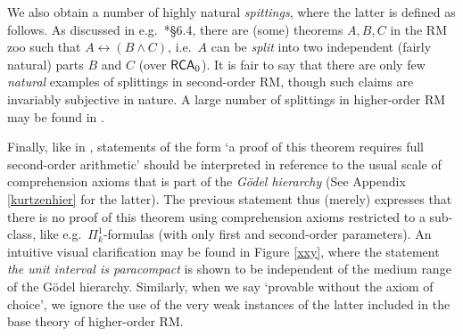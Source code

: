 \documentclass[reqno]{amsart}
\def\Z{\textup{\textsf{Z}}}
\def\RCA{\textup{\textsf{RCA}}}
\def\WKL{\textup{\textsf{WKL}}}
\def\WWKL{\textup{\textsf{WWKL}}}
\def\asa{\leftrightarrow}
\numberwithin{equation}{section}
\numberwithin{thm}{section}
\begin{document}
\smallskip

We also obtain a number of highly natural \emph{spittings}, where the latter is defined as follows.  
As discussed in e.g.\ \cite{dsliceke}*{\S6.4}, there are (some) theorems $A, B, C$ in the RM zoo such that $A\asa (B\wedge C)$, i.e.\ $A$ can be \emph{split} into two independent (fairly natural) parts $B$ and $C$ (over $\RCA_{0}$).  
It is fair to say that there are only few \emph{natural} examples of splittings in second-order RM, though such claims are invariably subjective in nature. 
A large number of splittings in higher-order RM may be found in \cite{samsplit}.  
%
%
%

\smallskip

Finally, like in \cite{dagsamIII, dagsamV}, statements of the form `a proof of this theorem requires full second-order arithmetic' should be interpreted in reference to the usual scale of comprehension axioms that is part of the \emph{G\"odel hierarchy} (See Appendix \ref{kurtzenhier} for the latter).  
The previous statement thus (merely) expresses that there is no proof of this theorem using comprehension axioms restricted to a sub-class, like e.g.\ $\Pi_{k}^{1}$-formulas (with only first and second-order parameters).  An intuitive visual clarification may be found in 
Figure \ref{xxy}, where the statement \emph{the unit interval is paracompact} is shown to be independent of the medium range of the G\"odel hierarchy.  Similarly, when we say `provable without the axiom of choice', we ignore the use of the very weak instances of the latter included in the base theory of higher-order RM.
\end{document}
